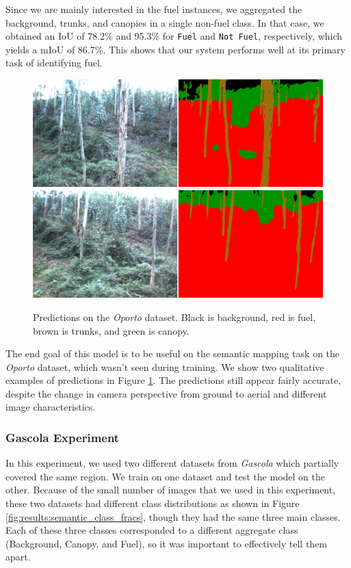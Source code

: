 Since we are mainly interested in the fuel instances, we aggregated the background, trunks, and canopies in a single non-fuel class. In that case, we obtained an IoU of 78.2\% and 95.3\% for \texttt{Fuel} and \texttt{Not Fuel}, respectively, which yields a mIoU of 86.7\%. This shows that our system performs well at its primary task of identifying fuel.

\begin{figure}
   \centering
    \includegraphics[width=\linewidth]{figs/results/semantic_segmentation/SeteFontes/qualatative_001400.png}  
    \includegraphics[width=\linewidth]{figs/results/semantic_segmentation/SeteFontes/qualatative_001600.png}  
    \caption{Predictions on the \textit{Oporto} dataset. Black is background, red is fuel, brown is trunks, and green is canopy.
    } 
    \label{fig:results:oporto_semantic_seg_qual}
\end{figure}


The end goal of this model is to be useful on the semantic mapping task on the \textit{Oporto} dataset, which wasn't seen during training. We show two qualitative examples of predictions in Figure \ref{fig:results:oporto_semantic_seg_qual}. The predictions still appear fairly accurate, despite the change in camera perspective from ground to aerial and different image characteristics. 


\subsubsection{Gascola Experiment}
In this experiment, we used two different datasets from \textit{Gascola} which partially covered the same region. We train on one dataset and test the model on the other. Because of the small number of images that we used in this experiment, these two datasets had different class distributions as shown in Figure \ref{fig:results:semantic_class_fracs}, though they had the same three main classes. Each of these three classes corresponded to a different aggregate class (Background, Canopy, and Fuel), so it was important to effectively tell them apart. 


